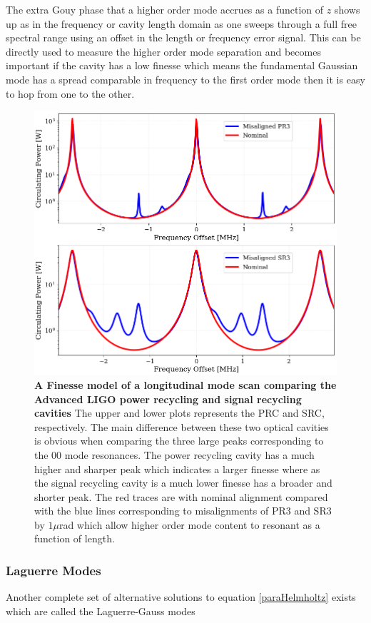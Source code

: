 		The extra Gouy phase that a higher order mode accrues as a function of $z$ shows up as in the frequency or cavity length domain as one sweeps through a full free spectral range using an offset in the length or frequency error signal.  This  can be directly used to measure the higher order mode separation and becomes important if the cavity has a low finesse which means the fundamental Gaussian mode has a spread comparable in frequency to the first order mode then it is easy to hop from one to the other.
		\begin{figure}[ht]
			\centering
			\includegraphics[width=0.65 \textwidth]{../Figures/PRC_SRC_ModeScan.png}
			\caption[A Finesse model of a longitudinal mode scan comparing the Advanced LIGO power recycling and signal recycling cavities.]
			{\textbf{A Finesse model of a longitudinal mode scan comparing the Advanced LIGO power recycling and signal recycling cavities}	The upper and lower plots represents the PRC and SRC, respectively.  The main difference between these two optical cavities is obvious when comparing the three large peaks corresponding to the 00 mode resonances.  The power recycling cavity has a much higher and sharper peak which indicates a larger finesse where as the signal recycling cavity is a much lower finesse has a broader and shorter peak.  The red traces are with nominal alignment compared with the blue lines corresponding to misalignments of PR3 and SR3 by $1 \mu$rad which allow higher order mode content to resonant as a function of length.}
			\label{fig:PRC_SRC_mode_scan}
		\end{figure}
	
	
		\subsubsection{Laguerre Modes}
		Another complete set of alternative solutions to equation \ref{paraHelmholtz} exists which are called the Laguerre-Gauss modes
		
